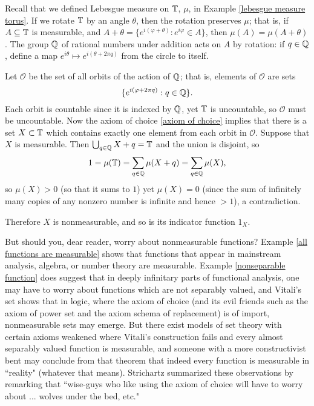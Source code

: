 \begin{example}
\label{Vitali set}
Recall that we defined Lebesgue measure on $\mathbb{T}$, $\mu$, in Example \ref{lebesgue measure torus}.
If we rotate $\mathbb{T}$ by an angle $\theta$, then the rotation preserves $\mu$; that is, if $A \subseteq \mathbb{T}$ is measurable, and $A + \theta = \{e^{i(\varphi+\theta)}: e^{i\varphi} \in A\}$, then $\mu(A) = \mu(A + \theta)$.
The group $\mathbb{Q}$ of rational numbers under addition acts on $A$ by rotation: if $q \in \mathbb{Q}$, define a map $e^{i\theta} \mapsto e^{i(\theta + 2\pi q)}$ from the circle to itself.

Let $\mathcal O$ be the set of all orbits of the action of $\mathbb{Q}$; that is, elements of $\mathcal O$ are sets
\[\{e^{i(\varphi+2\pi q)}: q \in \mathbb{Q}\}.\]
Each orbit is countable since it is indexed by $\mathbb{Q}$, yet $\mathbb{T}$ is uncountable, so $\mathcal O$ must be uncountable.
Now the axiom of choice \ref{axiom of choice} implies that there is a set $X \subset \mathbb{T}$ which contains exactly one element from each orbit in $\mathcal O$.
Suppose that $X$ is measurable. Then $\bigcup_{q \in \mathbb{Q}} X + q = \mathbb{T}$ and the union is disjoint, so
\[1 = \mu(\mathbb{T}) = \sum_{q \in \mathbb{Q}} \mu(X +  q) = \sum_{q \in \mathbb{Q}} \mu(X),\]
so $\mu(X) > 0$ (so that it sums to $1$) yet $\mu(X) = 0$ (since the sum of infinitely many copies of any nonzero number is infinite and hence $> 1$), a contradiction.

Therefore $X$ is nonmeasurable, and so is its indicator function $1_X$.
\end{example}

\begin{subsec}
But should you, dear reader, worry about nonmeasurable functions?
Example \ref{all functions are measurable} shows that functions that appear in mainstream analysis, algebra, or number theory are measurable.
Example \ref{nonseparable function} does suggest that in deeply infinitary parts of functional analysis, one may have to worry about functions which are not separably valued, and Vitali's set shows that in logic, where the axiom of choice (and its evil friends such as the axiom of power set and the axiom schema of replacement) is of import, nonmeasurable sets may emerge.
But there exist models of set theory \cite{Solovay1970} with certain axioms weakened where Vitali's construction fails and every almost separably valued function is measurable, and someone with a more constructivist bent may conclude from that theorem that indeed every function is measurable in ``reality" (whatever that means).
Strichartz \cite[Chapter 1]{strichartz2003guide} summarized these observations by remarking that ``wise-guys who like using the axiom of choice will have to worry about ... wolves under the bed, etc."
\end{subsec}

